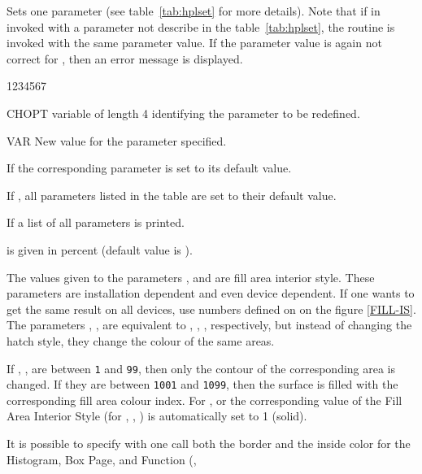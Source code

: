 \newpage

\Action
Sets one \HPLOT{} parameter (see table~\ref{tab:hplset} for more details). Note
that if  in invoked with a parameter not describe in the 
table~\ref{tab:hplset}, the \HIGZ{} routine  is invoked with the 
same parameter value. If the parameter value is again not correct for 
, then an error message is displayed.
\Pdesc
\begin{DLtt}{1234567}
\item[CHOPT] \CHARACTER{} variable of length 4 identifying the parameter to be 
             redefined.
\item[VAR]   New value for the parameter specified.
\end{DLtt}

\Remarks
\begin{UL}
\item If  the corresponding parameter is set to its default value.
\item If , all parameters listed in the table are set to 
      their default value.
\item If  a list of all parameters is printed.
\item {} is given in percent (default value is ).
\item The values given to the parameters ,  and 
       are fill area interior style. These parameters are 
      installation dependent and even device dependent. If one wants to get the
      same result on all devices, use numbers defined on on the figure 
      \ref{FILL-IS}. The parameters , ,  are 
      equivalent to , , , respectively, but 
      instead of changing the hatch style, they change the colour of the same 
      areas.
\item If , ,  are between {\tt1} and {\tt99},
      then only the contour of the corresponding area is changed. If they are 
      between {\tt1001} and {\tt1099}, then the surface is filled with the 
      corresponding fill area colour index. For ,  or
       the corresponding value of the Fill Area Interior Style 
      (for , , ) is automatically set to 1 
      (solid).
\item It is possible to specify with one  call both the border and
      the inside color for the Histogram, Box Page, and Function (, 

\end{UL}
